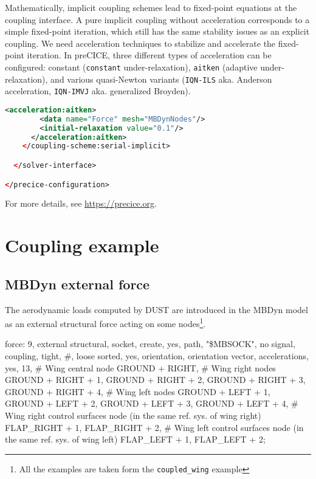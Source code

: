 Mathematically, implicit coupling schemes lead to fixed-point 
equations at the coupling interface. A pure implicit coupling 
without acceleration corresponds to a simple fixed-point iteration, 
which still has the same stability issues as an explicit coupling. 
We need acceleration techniques to stabilize and accelerate the fixed-point iteration. 
In preCICE, three different types of acceleration can be configured: 
constant (\texttt{constant} under-relaxation), 
\texttt{aitken} (adaptive under-relaxation), 
and various quasi-Newton variants (\texttt{IQN-ILS} aka. 
Anderson acceleration, \texttt{IQN-IMVJ} aka. generalized Broyden).
\begin{lstlisting}[language=XML]
      <acceleration:aitken>
        <data name="Force" mesh="MBDynNodes"/>
        <initial-relaxation value="0.1"/>
      </acceleration:aitken>		
    </coupling-scheme:serial-implicit>

  </solver-interface>

</precice-configuration>
\end{lstlisting}

For more details, see \url{https://precice.org}.

\section{Coupling example}

\subsection{MBDyn external force}
The aerodynamic loads computed by DUST are introduced in the MBDyn model as an external structural force acting on some nodes\footnote[1]{All the examples are taken form the \texttt{coupled\_wing} example}.
\begin{inputfile}[frame=single, caption={}, label={}]
  force: 9, external structural,
  socket,
    create, yes,
    path, "\$MBSOCK",
    no signal,
  coupling, tight, #, loose
  sorted, yes,
  orientation, orientation vector,
  accelerations, yes,
  13,
  # Wing central node 
  GROUND + RIGHT,
  # Wing right nodes 
  GROUND + RIGHT + 1, 
  GROUND + RIGHT + 2, 
  GROUND + RIGHT + 3, 
  GROUND + RIGHT + 4,
  # Wing left nodes 
  GROUND + LEFT + 1, 
  GROUND + LEFT + 2, 
  GROUND + LEFT + 3, 
  GROUND + LEFT + 4,
  # Wing right control surfaces node (in the same ref. sys. of wing right)
  FLAP_RIGHT + 1, 
  FLAP_RIGHT + 2,
  # Wing left control surfaces node (in the same ref. sys. of wing left)
  FLAP_LEFT + 1, 
  FLAP_LEFT + 2;
\end{inputfile}

